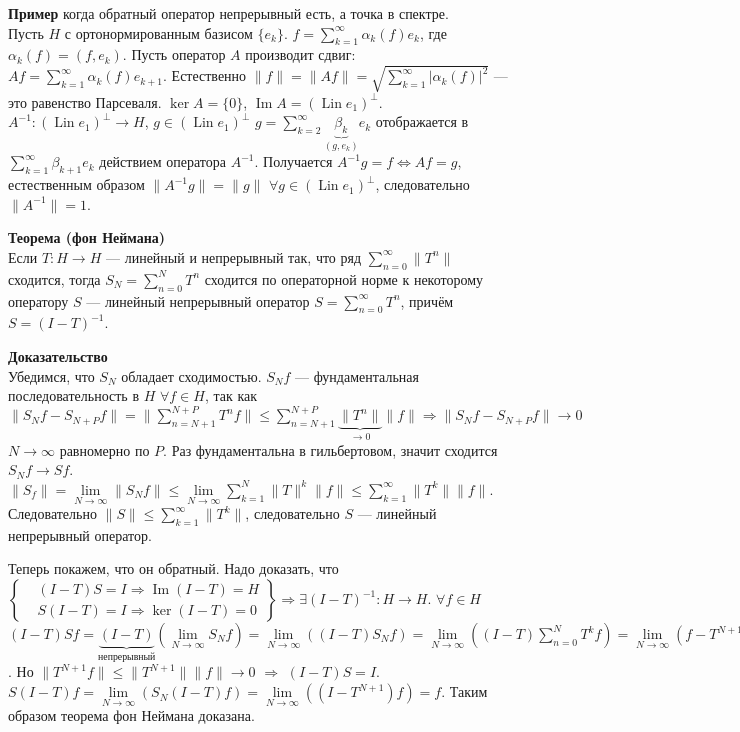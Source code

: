 \documentclass[12pt]{article}
\DeclareMathOperator{\Imm}{Im}
\DeclareMathOperator{\Lin}{Lin}
\begin{document}
\textbf{Пример} когда обратный оператор непрерывный есть, а точка в спектре.\\
Пусть $H$ с ортонормированным базисом $\{e_k\}$.
$f = \sum \limits_{k = 1}^{\infty} \alpha_k(f) e_k$, где $\alpha_k(f)=(f, e_k)$.
Пусть оператор $A$ производит сдвиг: $Af = \sum \limits_{k = 1}^{\infty} \alpha_k(f) e_{k+1}$.
Естественно $\|f\| = \|Af\| = \sqrt{\sum \limits_{k = 1}^{\infty} |\alpha_k(f)|^2}$ --- это равенство Парсеваля.
$\ker A = \{0\}$, $\Imm A = (\Lin e_1)^{\perp}$.
$A^{-1} : (\Lin e_1)^{\perp} \to H$, $g \in (\Lin e_1)^{\perp}$ $g = \sum \limits_{k = 2}^{\infty}\underbrace{\beta_k}_{(g, e_k)}e_k$ отображается
в $\sum\limits_{k = 1}^{\infty} \beta_{k + 1}e_k$ действием оператора $A^{-1}$.
Получается $A^{-1}g = f \Leftrightarrow Af = g$, естественным образом $\|A^{-1}g\| = \|g\|$ $\forall g \in (\Lin e_1)^{\perp}$, следовательно $\|A^{-1}\| = 1$.

\textbf{Теорема (фон Неймана)}\\
Если $T : H \to H$ --- линейный и непрерывный так, что ряд $\sum_{n = 0}^\infty \|T^n\|$ сходится, тогда $S_N = \sum_{n = 0}^N T^n$ сходится по операторной норме
к некоторому оператору $S$ --- линейный непрерывный оператор $S = \sum_{n = 0}^\infty T^n$, причём $S = (I - T)^{-1}$.

\textbf{Доказательство}\\
Убедимся, что $S_N$ обладает сходимостью.
$S_N f$ --- фундаментальная последовательность в $H$ $\forall f \in H$, так как $\|S_N f - S_{N+P} f\| = \|\sum_{n = N + 1}^{N + P} T^n f\| \le 
\sum_{n = N + 1}^{N + P}\underbrace{\|T^n\|}_{\to 0}\|f\| \Rightarrow \|S_N f - S_{N+P} f\| \to 0$ $N \to \infty$ равномерно по $P$.
Раз фундаментальна в гильбертовом, значит сходится $S_N f \to Sf$.
$\|S_f\| = \lim \limits_{N \to \infty}\|S_N f\| \le \lim \limits_{N \to \infty} \sum_{k = 1}^N \|T\|^k\|f\| \le \sum_{k = 1}^{\infty} \|T^k\| \|f\|$.
Следовательно $\|S\| \le \sum \limits_{k = 1}^{\infty}\|T^k\|$, следовательно $S$ --- линейный непрерывный оператор.

Теперь покажем, что он обратный.
Надо доказать, что 
$
\left\{
    \begin{aligned}
        &(I - T)S = I \Rightarrow \Imm(I - T) = H\\
        &S(I - T) = I \Rightarrow \ker(I - T) = 0
    \end{aligned}
\right\} \Rightarrow \exists (I - T)^{-1} : H \to H
$.
$\forall f \in H$ $(I - T)Sf = \underbrace{(I - T)}_{\text{непрерывный}}(\lim \limits_{N \to \infty} S_N f) = \lim \limits_{N \to \infty}((I - T)S_N f) = 
\lim \limits_{N \to \infty}((I - T) \sum\limits_{n = 0}^N T^k f) = \lim \limits_{N \to \infty}(f - T^{N+1}f)$.
Но $\|T^{N+1}f\| \le \|T^{N+1}\|\|f\| \to 0$ $\Rightarrow$ $(I - T)S = I$.
$S(I - T)f = \lim \limits_{N \to \infty}(S_N(I - T)f) = \lim \limits_{N \to \infty}((I - T^{N+1})f) = f$.
Таким образом теорема фон Неймана доказана.
\end{document}

